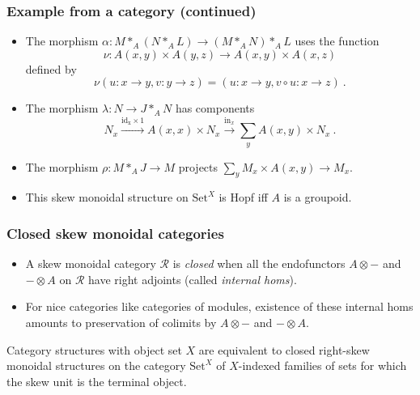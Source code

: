 \documentclass{beamer}
\newcommand{\lra}{\longrightarrow}
\def\CR{{\mathscr R}}
\begin{document}
\begin{frame}
  \frametitle{Example from a category (continued)}
 \begin{itemize}
\item<1->The morphism $\alpha : M\ast_A (N\ast_A L) \lra (M\ast_A N)\ast_A L$ uses the function
$$\nu : A(x,y)\times A(y,z) \lra A(x,y)\times A(x,z)$$
defined by $$\nu(u:x\rightarrow y, v: y\rightarrow z) = (u:x\rightarrow y, v\circ u:x\rightarrow z) \ .$$ 
\item<2-> 
The morphism $\lambda : N \lra J\ast_A N$ has components
$$N_x \stackrel{\mathrm{id_x}\times 1}\lra A(x,x)\times N_x \stackrel{\mathrm{in}_x}\lra \sum_y{A(x,y)\times N_x} \ .$$ 
\item<3-> 
The morphism $\rho : M\ast_A J\lra M$ projects $\sum_y{M_x\times A(x,y) \lra M_x}$. 
\item<4-> This skew monoidal structure on $\mathrm{Set}^X$ is Hopf iff $A$ is a groupoid. 
 \end{itemize}
\end{frame}

 \begin{frame}
  \frametitle{Closed skew monoidal categories}
\begin{itemize}
\item A skew monoidal category $\CR$ is {\em closed} when all the endofunctors 
$A\otimes -$ and $-\otimes A$ on $\CR$ have right adjoints (called {\em internal homs}).
\pause
\item For nice categories like categories of modules, existence of these internal homs
amounts to preservation of colimits by $A\otimes -$ and $-\otimes A$.
 \end{itemize}
  \pause
 \begin{theorem}
Category structures with object set $X$ are equivalent to closed right-skew monoidal structures
on the category $\mathrm{Set}^{X}$ of $X$-indexed families of sets for which the skew unit is the terminal object. 
 \end{theorem}
 \end{frame}
 
\end{document}
